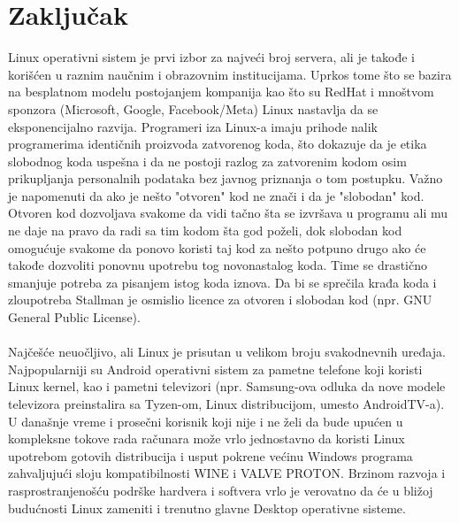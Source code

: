 \documentclass[a4paper,14pt]{article}
\begin{document}
\section*{Zaključak}
Linux operativni sistem je prvi izbor za najveći broj servera, ali je takođe i korišćen u raznim naučnim i obrazovnim institucijama. Uprkos tome što se bazira na besplatnom modelu postojanjem kompanija kao što su RedHat i mnoštvom sponzora (Microsoft, Google, Facebook/Meta) Linux nastavlja da se eksponencijalno razvija. Programeri iza Linux-a imaju prihode nalik programerima identičnih proizvoda zatvorenog koda, što dokazuje da je etika slobodnog koda uspešna i da ne postoji razlog za zatvorenim kodom osim prikupljanja personalnih podataka bez javnog priznanja o tom postupku. Važno je napomenuti da ako je nešto "otvoren" kod ne znači i da je "slobodan" kod. Otvoren kod dozvoljava svakome da vidi tačno šta se izvršava u programu ali mu ne daje na pravo da radi sa tim kodom šta god poželi, dok slobodan kod omogućuje svakome da ponovo koristi taj kod za nešto potpuno drugo ako će takođe dozvoliti ponovnu upotrebu tog novonastalog koda. Time se drastično smanjuje potreba za pisanjem istog koda iznova. Da bi se sprečila krađa koda i zloupotreba Stallman je osmislio licence za otvoren i slobodan kod (npr. GNU General Public License\cite{gpl}).
\\\\
Najčešće neuočljivo, ali Linux je prisutan u velikom broju svakodnevnih uređaja. Najpopularniji su Android operativni sistem za pametne telefone koji koristi Linux kernel, kao i pametni televizori (npr. Samsung-ova odluka da nove modele televizora preinstalira sa Tyzen-om, Linux distribucijom, umesto AndroidTV-a). U današnje vreme i prosečni korisnik koji nije i ne želi da bude upućen u kompleksne tokove rada računara može vrlo jednostavno da koristi Linux upotrebom gotovih distribucija i usput pokrene većinu Windows programa zahvaljujući sloju kompatibilnosti WINE\cite{wine} i VALVE\cite{valve} PROTON\cite{proton}. Brzinom razvoja i rasprostranjenošću podrške hardvera i softvera vrlo je verovatno da će u bližoj budućnosti Linux zameniti i trenutno glavne Desktop operativne sisteme.
\newpage

\renewcommand\refname{Literatura}


\newpage
\end{document}
